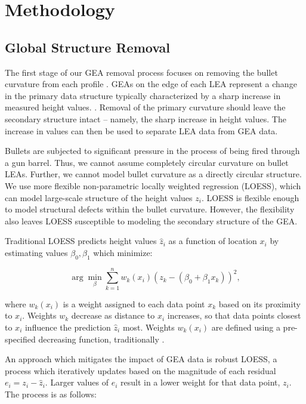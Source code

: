 \documentclass[12pt]{article}
\begin{document}
\section{Methodology}

\subsection{Global Structure Removal}

The first stage of our GEA removal process focuses on removing the
bullet curvature from each profile . GEAs on the edge of
each LEA represent a change in the primary data structure typically
characterized by a sharp increase in measured height values.
. Removal of the
primary curvature should leave the secondary structure intact -- namely,
the sharp increase in height values. The increase in values can then be
used to separate LEA data from GEA data.

Bullets are subjected to significant pressure in the process of being
fired through a gun barrel. Thus, we cannot assume completely circular
curvature on bullet LEAs. Further, we cannot model bullet curvature as a
directly circular structure. We use more flexible non-parametric locally
weighted regression (LOESS), which can model large-scale structure of
the height values \(z_i\). LOESS is flexible enough to model structural
defects within the bullet curvature. However, the flexibility also
leaves LOESS susceptible to modeling the secondary structure of the GEA.

Traditional LOESS predicts height values \(\widehat{z}_i\) as a function
of location \(x_i\) by estimating values \(\beta_0, \beta_1\) which
minimize:

\[ \arg\min_{\beta} \sum_{k=1}^n w_k(x_i) (z_k - (\beta_0 + \beta_1x_k))^2,\]

where \(w_k(x_i)\) is a weight assigned to each data point \(x_k\) based
on its proximity to \(x_i\). Weights \(w_k\) decrease as distance to
\(x_i\) increases, so that data points closest to \(x_i\) influence the
prediction \(\widehat{z}_i\) most. Weights \(w_k(x_i)\) are defined
using a pre-specified decreasing function, traditionally
.

An approach which mitigates the impact of GEA data is robust LOESS, a
process which iteratively updates  based on the
magnitude of each residual \(e_i = z_i - \widehat{z}_i\). Larger values
of \(e_i\) result in a lower weight for that data point, \(z_i\). The
process is as follows:
\end{document}
